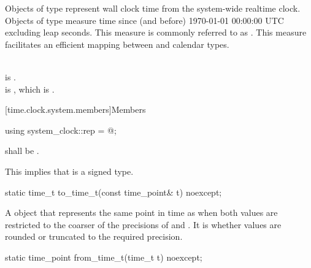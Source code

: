 \pnum
Objects of type  represent wall clock time from the system-wide
realtime clock.
Objects of type  measure time since (and before)
1970-01-01 00:00:00 UTC excluding leap seconds.
This measure is commonly referred to as .
This measure facilitates an efficient mapping between
 and calendar types.
\begin{example} \\
 is . \\
 is ,
which is . \\
\end{example}

[time.clock.system.members]{Members}

%
\begin{itemdecl}
using system_clock::rep = @\unspec@;
\end{itemdecl}

\begin{itemdescr}
\pnum
\requires {} shall
be .\\
\begin{note} This implies that  is a signed type. \end{note}
\end{itemdescr}

%
\begin{itemdecl}
static time_t to_time_t(const time_point& t) noexcept;
\end{itemdecl}

\begin{itemdescr}
\pnum
\returns A  object that represents the same point in time as 
when both values are restricted to the coarser of the precisions of  and
.
It is 
whether values are rounded or truncated to the required precision.
\end{itemdescr}

%
\begin{itemdecl}
static time_point from_time_t(time_t t) noexcept;
\end{itemdecl}


